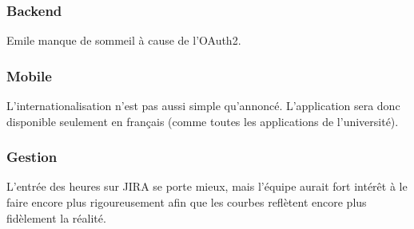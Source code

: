 \subsubsection{Backend}
Emile manque de sommeil à cause de l'OAuth2.

\subsubsection{Mobile}
L'internationalisation n'est pas aussi simple qu'annoncé. L'application sera donc disponible seulement en français (comme toutes les applications de l'université).

\subsubsection{Gestion}
L'entrée des heures sur JIRA se porte mieux, mais l'équipe aurait fort intérêt à le faire encore plus rigoureusement afin que les courbes reflètent encore plus fidèlement la réalité.
